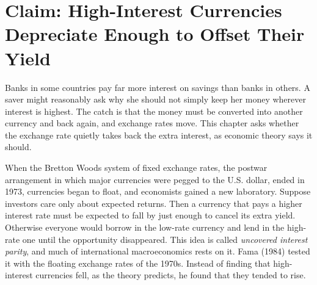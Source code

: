 \makeatletter
{}
\makeatother

\makeatletter
\makeatother

\chapter{Claim: High-Interest Currencies Depreciate Enough to Offset Their Yield}
\label{ch:11}
\providecommand{\term}[1]{\emph{#1}}

Banks in some countries pay far more interest on savings than banks in others. A saver might reasonably ask why she should not simply keep her money wherever interest is highest. The catch is that the money must be converted into another currency and back again, and exchange rates move. This chapter asks whether the exchange rate quietly takes back the extra interest, as economic theory says it should.

When the Bretton Woods system of fixed exchange rates, the postwar arrangement in which major currencies were pegged to the U.S. dollar, ended in 1973, currencies began to float, and economists gained a new laboratory. Suppose investors care only about expected returns. Then a currency that pays a higher interest rate must be expected to fall by just enough to cancel its extra yield. Otherwise everyone would borrow in the low-rate currency and lend in the high-rate one until the opportunity disappeared. This idea is called \term{uncovered interest parity}, and much of international macroeconomics rests on it. Fama (1984) tested it with the floating exchange rates of the 1970s. Instead of finding that high-interest currencies fell, as the theory predicts, he found that they tended to rise.

